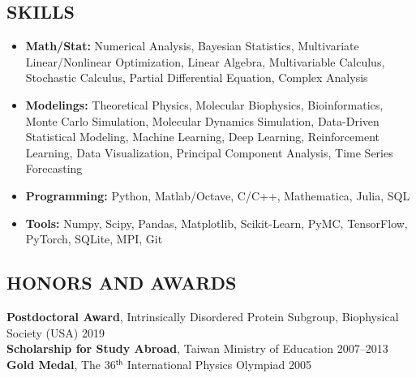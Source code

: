 \documentclass[11pt,letterpaper, sans]{article}
\newcommand{\newsec}[1]{\subsection*{\hspace{-1.5pt}\uppercase{#1}}}
\begin{document}
\begin{flushleft}


\newsec{Skills}
\begin{itemize}[leftmargin=*]\itemsep-0.1em
%
\item {\bf Math/Stat:}
Numerical Analysis, 
Bayesian Statistics, 
Multivariate Linear/Nonlinear Optimization, 
Linear Algebra, 
Multivariable Calculus,
Stochastic Calculus,
Partial Differential Equation, 
Complex Analysis %
\item{\bf Modelings:}
Theoretical Physics, Molecular Biophysics, Bioinformatics,
Monte Carlo Simulation, Molecular Dynamics Simulation, %
Data-Driven Statistical Modeling,
Machine Learning,
Deep Learning, Reinforcement Learning, %
Data Visualization, 
Principal Component Analysis, 
Time Series Forecasting
%
\item{\bf Programming:} 
Python, Matlab/Octave, C/C++, Mathematica, Julia, SQL
%
\item{\bf Tools:}
Numpy, Scipy, Pandas, Matplotlib, Scikit-Learn, PyMC, TensorFlow, PyTorch, SQLite, MPI, Git
%


\end{itemize}


\newsec{Honors and Awards}

\noindent
{\bf Postdoctoral Award}, Intrinsically Disordered Protein Subgroup, Biophysical Society (USA) \hfill 2019 \\
{\bf Scholarship for Study Abroad}, Taiwan Ministry of Education  \hfill 2007--2013 \\
{\bf Gold Medal}, The 36$^{ \mathsf{th}}$ International Physics Olympiad \hfill 2005


\end{flushleft}
\end{document}
